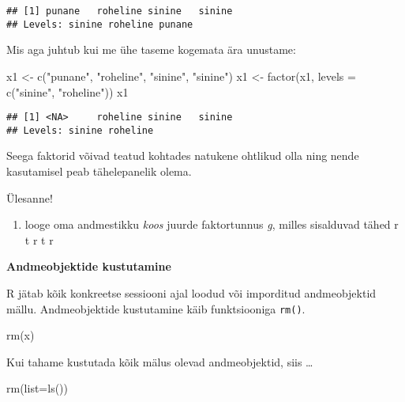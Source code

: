 \documentclass[
]{book}
\newenvironment{Shaded}{\begin{snugshade}}{\end{snugshade}}
\newcommand{\AttributeTok}[1]{\textcolor[rgb]{0.77,0.63,0.00}{#1}}
\newcommand{\FunctionTok}[1]{\textcolor[rgb]{0.00,0.00,0.00}{#1}}
\newcommand{\NormalTok}[1]{#1}
\newcommand{\OtherTok}[1]{\textcolor[rgb]{0.56,0.35,0.01}{#1}}
\newcommand{\StringTok}[1]{\textcolor[rgb]{0.31,0.60,0.02}{#1}}
\providecommand{\tightlist}{%
  \setlength{\itemsep}{0pt}\setlength{\parskip}{0pt}}
\begin{document}
\begin{verbatim}
## [1] punane   roheline sinine   sinine  
## Levels: sinine roheline punane
\end{verbatim}

Mis aga juhtub kui me ühe taseme kogemata ära unustame:

\begin{Shaded}
\begin{Highlighting}[]
\NormalTok{x1 }\OtherTok{\textless{}{-}} \FunctionTok{c}\NormalTok{(}\StringTok{"punane"}\NormalTok{, }\StringTok{"roheline"}\NormalTok{, }\StringTok{"sinine"}\NormalTok{, }\StringTok{"sinine"}\NormalTok{)}
\NormalTok{x1 }\OtherTok{\textless{}{-}} \FunctionTok{factor}\NormalTok{(x1, }\AttributeTok{levels =} \FunctionTok{c}\NormalTok{(}\StringTok{"sinine"}\NormalTok{, }\StringTok{"roheline"}\NormalTok{))}
\NormalTok{x1}
\end{Highlighting}
\end{Shaded}

\begin{verbatim}
## [1] <NA>     roheline sinine   sinine  
## Levels: sinine roheline
\end{verbatim}

Seega faktorid võivad teatud kohtades natukene ohtlikud olla ning nende kasutamisel peab tähelepanelik olema.

Ülesanne!

\begin{enumerate}
\def\labelenumi{\arabic{enumi}.}
\tightlist
\item
  looge oma andmestikku \emph{koos} juurde faktortunnus \emph{g}, milles sisalduvad tähed r t r t r
\end{enumerate}

\textbf{Andmeobjektide kustutamine}

R jätab kõik konkreetse sessiooni ajal loodud või imporditud andmeobjektid mällu.
Andmeobjektide kustutamine käib funktsiooniga \texttt{rm()}.

\begin{Shaded}
\begin{Highlighting}[]
\FunctionTok{rm}\NormalTok{(x)}
\end{Highlighting}
\end{Shaded}

Kui tahame kustutada kõik mälus olevad andmeobjektid, siis \ldots{}

\begin{Shaded}
\begin{Highlighting}[]
\FunctionTok{rm}\NormalTok{(}\AttributeTok{list=}\FunctionTok{ls}\NormalTok{())}
\end{Highlighting}
\end{Shaded}
\end{document}

